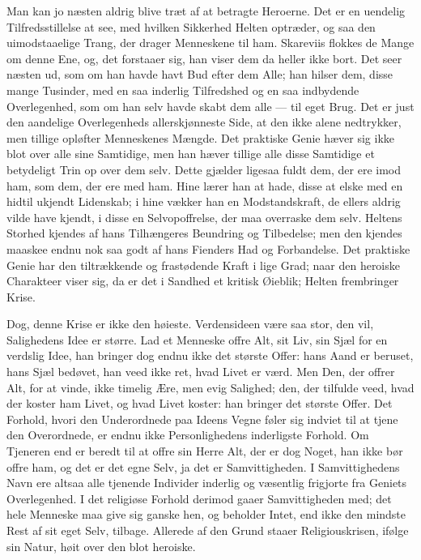 \documentclass[12pt,a4paper]{book}
\begin{document}
Man kan jo næsten aldrig blive træt af at betragte
Heroerne. Det er en uendelig Tilfredsstillelse at see, med hvilken Sikkerhed Helten
optræder, og saa den uimodstaaelige Trang, der drager Menneskene til ham. Skareviis
flokkes de Mange om denne Ene, og, det forstaaer sig, han viser dem da heller ikke bort.
Det seer næsten ud, som om han havde havt Bud efter dem Alle; han hilser dem, disse
mange Tusinder, med en saa inderlig Tilfredshed og en saa indbydende Overlegenhed, som
om han selv havde skabt dem alle --- til eget Brug. Det er just den aandelige
Overlegenheds allerskjønneste Side, at den ikke alene nedtrykker, men tillige opløfter
Menneskenes Mængde. Det praktiske Genie hæver sig ikke blot over alle sine Samtidige,
men han hæver tillige alle disse Samtidige et betydeligt Trin op over dem selv. Dette
gjælder ligesaa fuldt dem, der ere imod ham, som dem, der ere med ham. Hine lærer han
at hade, disse at elske med en hidtil ukjendt Lidenskab; i hine vækker han en
Modstandskraft, de ellers aldrig vilde have kjendt, i disse en Selvopoffrelse, der maa
overraske dem selv. Heltens Storhed kjendes af hans Tilhængeres Beundring og
Tilbedelse; men den kjendes maaskee endnu nok saa godt af hans Fienders Had og
Forbandelse. Det praktiske Genie har den tiltrækkende og frastødende Kraft i lige Grad;
naar den heroiske Charakteer viser sig, da er det i Sandhed et kritisk Øieblik; Helten
frembringer Krise.

Dog, denne Krise er ikke den høieste. Verdensideen være saa stor, den vil, Salighedens
Idee er større. Lad et Menneske offre Alt, sit Liv, sin Sjæl for en verdslig Idee, han
bringer dog endnu ikke det største Offer: hans Aand er beruset, hans Sjæl bedøvet, han
veed ikke ret, hvad Livet er værd. Men Den, der offrer Alt, for at vinde, ikke timelig
Ære, men evig Salighed; den, der tilfulde veed, hvad der koster ham Livet, og hvad
Livet koster: han bringer det største Offer. Det Forhold, hvori den
Underordnede paa Ideens Vegne føler sig indviet til at tjene den Overordnede, er endnu
ikke Personlighedens inderligste Forhold. Om Tjeneren end er beredt til at offre sin
Herre Alt, der er dog Noget, han ikke bør offre ham, og det er det egne Selv, ja det er
Samvittigheden. I Samvittighedens Navn ere altsaa alle tjenende Individer inderlig og
væsentlig frigjorte fra Geniets Overlegenhed. I det religiøse Forhold derimod gaaer
Samvittigheden med; det hele Menneske maa give sig ganske hen, og beholder Intet, end
ikke den mindste Rest af sit eget Selv, tilbage. Allerede af den Grund staaer
Religiouskrisen, ifølge sin Natur, høit over den blot heroiske.
\end{document}
